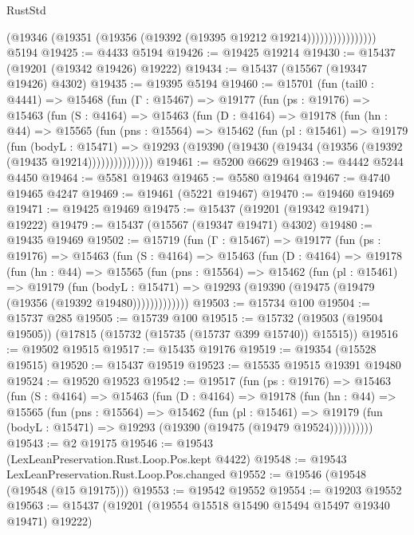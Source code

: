 \begin{lexlean}{RustStd}
\begin{coremodule}
                          (@19346 (@19351 (@19356 (@19392 (@19395 @19212 @19214))))))))))))))))
    @5194
@19425 := @4433 @5194
@19426 := @19425 @19214
@19430 := @15437 (@19201 (@19342 @19426) @19222)
@19434 := @15437 (@15567 (@19347 @19426) @4302)
@19435 := @19395 @5194
@19460 := @15701
    (fun (tail0 : @4441) =>
    @15468
      (fun (Γ : @15467) =>
      @19177
        (fun (ps : @19176) =>
        @15463
          (fun (S : @4164) =>
          @15463
            (fun (D : @4164) =>
            @19178
              (fun (hn : @44) =>
              @15565
                (fun (pns : @15564) =>
                @15462
                  (fun (pl : @15461) =>
                  @19179
                    (fun (bodyL : @15471) =>
                    @19293 (@19390 (@19430 (@19434 (@19356 (@19392 (@19435 @19214)))))))))))))))
@19461 := @5200 @6629
@19463 := @4442 @5244 @4450
@19464 := @5581 @19463
@19465 := @5580 @19464
@19467 := @4740 @19465 @4247
@19469 := @19461 (@5221 @19467)
@19470 := @19460 @19469
@19471 := @19425 @19469
@19475 := @15437 (@19201 (@19342 @19471) @19222)
@19479 := @15437 (@15567 (@19347 @19471) @4302)
@19480 := @19435 @19469
@19502 := @15719
    (fun (Γ : @15467) =>
    @19177
      (fun (ps : @19176) =>
      @15463
        (fun (S : @4164) =>
        @15463
          (fun (D : @4164) =>
          @19178
            (fun (hn : @44) =>
            @15565
              (fun (pns : @15564) =>
              @15462
                (fun (pl : @15461) =>
                @19179
                  (fun (bodyL : @15471) =>
                  @19293 (@19390 (@19475 (@19479 (@19356 (@19392 @19480)))))))))))))
@19503 := @15734 @100
@19504 := @15737 @285
@19505 := @15739 @100
@19515 := @15732 (@19503 (@19504 @19505)) (@17815 (@15732 (@15735 (@15737 @399 @15740)) @15515))
@19516 := @19502 @19515
@19517 := @15435 @19176
@19519 := @19354 (@15528 @19515)
@19520 := @15437 @19519
@19523 := @15535 @19515 @19391 @19480
@19524 := @19520 @19523
@19542 := @19517
    (fun (ps : @19176) =>
    @15463
      (fun (S : @4164) =>
      @15463
        (fun (D : @4164) =>
        @19178
          (fun (hn : @44) =>
          @15565
            (fun (pns : @15564) =>
            @15462
              (fun (pl : @15461) =>
              @19179 (fun (bodyL : @15471) => @19293 (@19390 (@19475 (@19479 @19524))))))))))
@19543 := @2 @19175
@19546 := @19543 (LexLeanPreservation.Rust.Loop.Pos.kept @4422)
@19548 := @19543 LexLeanPreservation.Rust.Loop.Pos.changed
@19552 := @19546 (@19548 (@19548 (@15 @19175)))
@19553 := @19542 @19552
@19554 := @19203 @19552
@19563 := @15437 (@19201 (@19554 @15518 @15490 @15494 @15497 @19340 @19471) @19222)

\end{coremodule}
\end{lexlean}
